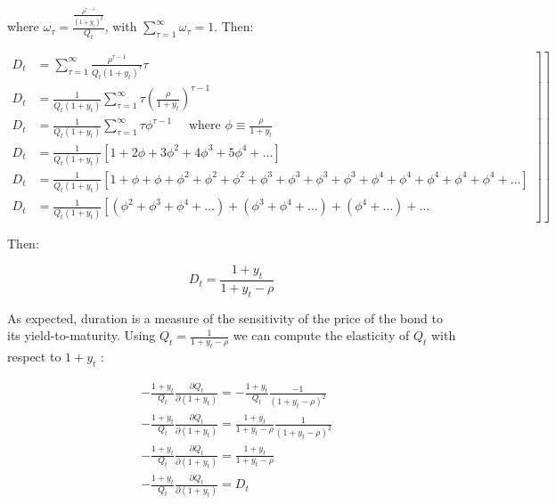 \documentclass[10pt]{article}
\begin{document}
where $\omega_{\tau}=\frac{\frac{\rho^{\tau-1}}{\left(1+y_{t}\right)^{2}}}{Q_{t}}$, with $\sum_{\tau=1}^{\infty} \omega_{\tau}=1$. Then:

\begin{equation*}
\left.\left.\begin{array}{rl}
D_{t} & =\sum_{\tau=1}^{\infty} \frac{\rho^{\tau-1}}{Q_{t}\left(1+y_{t}\right)^{\tau}} \tau \\
D_{t} & =\frac{1}{Q_{t}\left(1+y_{t}\right)} \sum_{\tau=1}^{\infty} \tau\left(\frac{\rho}{1+y_{t}}\right)^{\tau-1} \\
D_{t} & =\frac{1}{Q_{t}\left(1+y_{t}\right)} \sum_{\tau=1}^{\infty} \tau \phi^{\tau-1} \quad \text { where } \phi \equiv \frac{\rho}{1+y_{t}} \\
D_{t} & =\frac{1}{Q_{t}\left(1+y_{t}\right)}\left[1+2 \phi+3 \phi^{2}+4 \phi^{3}+5 \phi^{4}+\ldots\right] \\
D_{t} & =\frac{1}{Q_{t}\left(1+y_{t}\right)}\left[1+\phi+\phi+\phi^{2}+\phi^{2}+\phi^{2}+\phi^{3}+\phi^{3}+\phi^{3}+\phi^{3}+\phi^{4}+\phi^{4}+\phi^{4}+\phi^{4}+\phi^{4}+\ldots\right] \\
D_{t} & =\frac{1}{Q_{t}\left(1+y_{t}\right)}\left[\left(\phi^{2}+\phi^{3}+\phi^{4}+\ldots\right)+\left(\phi^{3}+\phi^{4}+\ldots\right)+\left(\phi^{4}+\ldots\right)+\ldots\right.
\end{array}\right]\right]
\end{equation*}

Then:

\begin{equation*}
D_{t}=\frac{1+y_{t}}{1+y_{t}-\rho}
\end{equation*}

As expected, duration is a measure of the sensitivity of the price of the bond to its yield-to-maturity. Using $Q_{t}=\frac{1}{1+y_{t}-\rho}$ we can compute the elasticity of $Q_{t}$ with respect to $1+y_{t}$ :

\begin{equation*}
\begin{aligned}
& -\frac{1+y_{t}}{Q_{t}} \frac{\partial Q_{t}}{\partial\left(1+y_{t}\right)}=-\frac{1+y_{t}}{Q_{t}} \frac{-1}{\left(1+y_{t}-\rho\right)^{2}} \\
& -\frac{1+y_{t}}{Q_{t}} \frac{\partial Q_{t}}{\partial\left(1+y_{t}\right)}=\frac{1+y_{t}}{1+y_{t}-\rho} \frac{1}{\left(1+y_{t}-\rho\right)^{2}} \\
& -\frac{1+y_{t}}{Q_{t}} \frac{\partial Q_{t}}{\partial\left(1+y_{t}\right)}=\frac{1+y_{t}}{1+y_{t}-\rho} \\
& -\frac{1+y_{t}}{Q_{t}} \frac{\partial Q_{t}}{\partial\left(1+y_{t}\right)}=D_{t}
\end{aligned}
\end{equation*}
\end{document}
